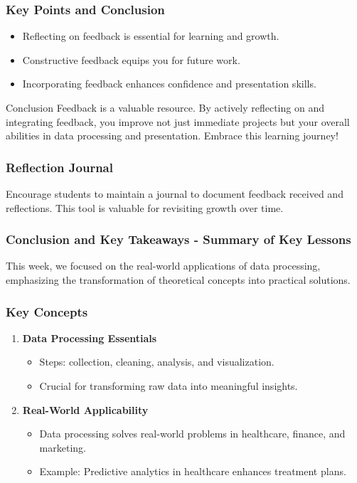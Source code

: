 \documentclass{beamer}
\begin{document}
\begin{frame}[fragile]
    \frametitle{Key Points and Conclusion}
    \begin{itemize}
        \item Reflecting on feedback is essential for learning and growth.
        \item Constructive feedback equips you for future work.
        \item Incorporating feedback enhances confidence and presentation skills.
    \end{itemize}

    \begin{block}{Conclusion}
        Feedback is a valuable resource. By actively reflecting on and integrating feedback, you improve not just immediate projects but your overall abilities in data processing and presentation. Embrace this learning journey!
    \end{block}
\end{frame}

\begin{frame}[fragile]
    \frametitle{Reflection Journal}
    Encourage students to maintain a journal to document feedback received and reflections. This tool is valuable for revisiting growth over time.
\end{frame}

\begin{frame}[fragile]
    \frametitle{Conclusion and Key Takeaways - Summary of Key Lessons}
    This week, we focused on the real-world applications of data processing, emphasizing the transformation of theoretical concepts into practical solutions.
\end{frame}

\begin{frame}[fragile]
    \frametitle{Key Concepts}
    \begin{enumerate}
        \item \textbf{Data Processing Essentials}
            \begin{itemize}
                \item Steps: collection, cleaning, analysis, and visualization.
                \item Crucial for transforming raw data into meaningful insights.
            \end{itemize}
        \item \textbf{Real-World Applicability}
            \begin{itemize}
                \item Data processing solves real-world problems in healthcare, finance, and marketing.
                \item Example: Predictive analytics in healthcare enhances treatment plans.
            \end{itemize}
    \end{enumerate}
\end{frame}
\end{document}
